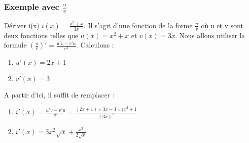 \documentclass[t]{beamer}
\begin{document}
\begin{frame}
\frametitle{Exemple avec $\frac{u}{v}$ }
\pause
\begin{block}{Dériver i(x)}
	$i(x) = \frac{x^2 + x}{3x}$. \pause Il s'agit d'une fonction de la forme $\frac{u}{v}$ \pause où u et v sont deux fonctions \pause telles que $u(x) = x^2 + x$ \pause et $v(x) = 3x$. \pause Nous allons utiliser la formule $\left( \frac{u}{v} \right)' = \frac{u'v - v'u}{v^2}$. \pause Calculons :
	\begin{enumerate}{}
		\item<+-> \(u'(x)= 2x + 1 \)
		\item<+-> \(v'(x) = 3 \) 
	\end{enumerate}
	\pause
	A partir d'ici, il suffit de remplacer : \pause
	\begin{enumerate}[]
	\item<+-> \(i'(x) = \frac{u'v - v'u}{v^2} = \frac{(2x+1) \times 3x - 3 \times (x^2+1}{(3x)^2}\) \pause
	\item<+-> \(i'(x) = 3x^2 \sqrt{x} + \frac{x^3}{2 \sqrt{x}} \)
	\end{enumerate}	
\end{block}
\end{frame}
\end{document}
